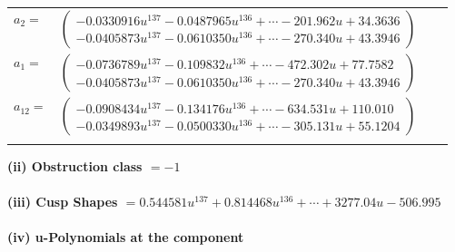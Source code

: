 \documentclass[1p]{elsarticle_modified}
\theoremstyle{definition}
\begin{document}
\begin{tabular}{m{7pt} m{180pt} m{7pt} m{180pt} }
\flushright $a_{2}=$&$\begin{pmatrix}-0.0330916 u^{137}-0.0487965 u^{136}+\cdots-201.962 u+34.3636\\-0.0405873 u^{137}-0.0610350 u^{136}+\cdots-270.340 u+43.3946\end{pmatrix}$ \\
\flushright $a_{1}=$&$\begin{pmatrix}-0.0736789 u^{137}-0.109832 u^{136}+\cdots-472.302 u+77.7582\\-0.0405873 u^{137}-0.0610350 u^{136}+\cdots-270.340 u+43.3946\end{pmatrix}$ \\
\flushright $a_{12}=$&$\begin{pmatrix}-0.0908434 u^{137}-0.134176 u^{136}+\cdots-634.531 u+110.010\\-0.0349893 u^{137}-0.0500330 u^{136}+\cdots-305.131 u+55.1204\end{pmatrix}$\\&\end{tabular}
\flushleft \textbf{(ii) Obstruction class $= -1$}\\~\\
\flushleft \textbf{(iii) Cusp Shapes $= 0.544581 u^{137}+0.814468 u^{136}+\cdots+3277.04 u-506.995$}\\~\\
\newpage\renewcommand{\arraystretch}{1}
\flushleft \textbf{(iv) u-Polynomials at the component}\newline \\
\end{document}
